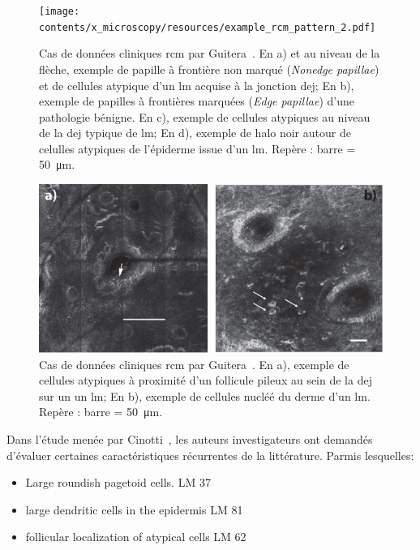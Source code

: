 \begin{figure}[H]
    \begin{center}
        \texttt{[image: contents/x\_microscopy/resources/example\_rcm\_pattern\_2.pdf]}
        \caption{Cas de données cliniques \gls{rcm} par Guitera~\cite{Guitera2010}. En a) et au niveau de la flèche, exemple de papille à frontière non marqué (\textit{Nonedge papillae}) et de cellules atypique d'un \gls{lm} acquise à la jonction \gls{dej}; En b), exemple de papilles à frontières marquées (\textit{Edge papillae}) d'une pathologie bénigne. En c), exemple de cellules atypiques au niveau de la \gls{dej} typique de \gls{lm}; En d), exemple de halo noir autour de celulles atypiques de l'épiderme issue d'un \gls{lm}. Repère : barre = \SI{50}{\micro\metre}.}
        \label{fig:example_rcm_pattern_2}
    \end{center} 
\end{figure}\par

\begin{figure}[H]
    \begin{center}
        \includegraphics[width=0.8 \linewidth]{contents/x_microscopy/resources/example_rcm_pattern_3.pdf}
        \caption{Cas de données cliniques \gls{rcm} par Guitera~\cite{Guitera2010}. En a), exemple de cellules atypiques à proximité d'un follicule pileux au sein de la \gls{dej} sur un un \gls{lm}; En b), exemple de cellules nucléé du derme d'un \gls{lm}. Repère : barre = \SI{50}{\micro\metre}.}
        \label{fig:example_rcm_pattern_3}
    \end{center} 
\end{figure}\par

Dans l'étude menée par Cinotti~\cite{Cinotti2018}, les auteurs investigateurs ont demandés d'évaluer certaines caractéristiques récurrentes de la littérature. Parmis lesquelles:
\begin{itemize}
    \item Large roundish pagetoid cells. LM 37%
    \item large dendritic cells in the epidermis LM 81%
    \item follicular localization of atypical cells LM 62%
\end{itemize}\par

